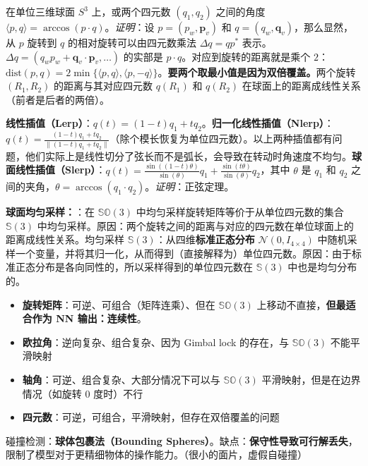\documentclass[
  8pt]{extarticle}
\providecommand{\tightlist}{%
  \setlength{\itemsep}{0pt}\setlength{\parskip}{0pt}}
\begin{document}
\begin{multicols*}{4}
在单位三维球面 \(S^3\) 上，或两个四元数 \((q_1, q_2)\) 之间的角度
\(\langle p, q \rangle = \arccos(p \cdot q)\)。\emph{证明}：设
\(p = (p_w, \mathbf{p}_v)\) 和 \(q = (q_w, \mathbf{q}_v)\)，那么显然，从
\(p\) 旋转到 \(q\) 的相对旋转可以由四元数乘法 \(\Delta q = q p^*\)
表示。\(\Delta q = (q_w p_w + \mathbf{q}_v \cdot \mathbf{p}_v, \dots)\)
的实部是 \(p \cdot q\)。对应到旋转的距离就是乘个
\(2\)：\(\text{dist}(p, q) = 2 \min \{\langle p, q \rangle, \langle p, -q \rangle\}\)。\textbf{要两个取最小值是因为双倍覆盖。}两个旋转
\((R_1, R_2)\) 的距离与其对应四元数 \(q(R_1)\) 和 \(q(R_2)\)
在球面上的距离成线性关系（前者是后者的两倍）。

\textbf{线性插值（Lerp）}：\(q(t) = (1-t)q_1 + tq_2\)。\textbf{归一化线性插值（Nlerp）}：\(q(t) = \frac{(1-t)q_1 + tq_2}{\|(1-t)q_1 + tq_2\|}\)（除个模长恢复为单位四元数）。以上两种插值都有问题，他们实际上是线性切分了弦长而不是弧长，会导致在转动时角速度不均匀。\textbf{球面线性插值（Slerp）}：\(q(t) = \frac{\sin((1-t)\theta)}{\sin(\theta)} q_1 + \frac{\sin(t\theta)}{\sin(\theta)} q_2\)，其中
\(\theta\) 是 \(q_1\) 和 \(q_2\)
之间的夹角，\(\theta = \arccos(q_1 \cdot q_2)\)。\emph{证明}：正弦定理。

\textbf{球面均匀采样：}：在 \(\mathbb{SO}(3)\)
中均匀采样旋转矩阵等价于从单位四元数的集合 \(\mathbb{S}(3)\)
中均匀采样。原因：两个旋转之间的距离与对应的四元数在单位球面上的距离成线性关系。均匀采样
\(\mathbb{S}(3)\)：从四维\textbf{标准正态分布}
\(\mathcal{N}(0, I_{4 \times 4})\)
中随机采样一个变量，并将其归一化，从而得到（直接解释为）单位四元数。原因：由于标准正态分布是各向同性的，所以采样得到的单位四元数在
\(\mathbb{S}(3)\) 中也是均匀分布的。

\begin{itemize}
\tightlist
\item
  \textbf{旋转矩阵}：可逆、可组合（矩阵连乘）、但在 \(\mathbb{SO}(3)\)
  上移动不直接，\textbf{但最适合作为 NN 输出：连续性}。
\item
  \textbf{欧拉角}：逆向复杂、组合复杂、因为 Gimbal lock 的存在，与
  \(\mathbb{SO}(3)\) 不能平滑映射
\item
  \textbf{轴角}：可逆、组合复杂、大部分情况下可以与 \(\mathbb{SO}(3)\)
  平滑映射，但是在边界情况（如旋转 \(0\) 度时）不行
\item
  \textbf{四元数}：可逆，可组合，平滑映射，但存在双倍覆盖的问题
\end{itemize}

碰撞检测：\textbf{球体包裹法（Bounding
Spheres）}。缺点：\textbf{保守性导致可行解丢失}，限制了模型对于更精细物体的操作能力。（很小的面片，虚假自碰撞）


\end{multicols*}
\end{document}
